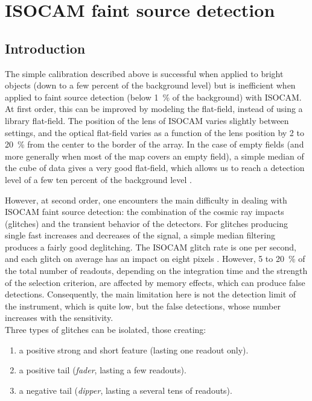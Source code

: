 \chapter{ISOCAM faint source detection}
\section{Introduction}

The simple calibration described above is successful when applied 
to bright objects (down to a 
few percent of the background level) but is inefficient when applied 
to faint source detection (below 1~\% of the background) with ISOCAM. 
At first order, this can be improved by modeling the flat-field, 
instead of using a library flat-field. The position of the 
lens of ISOCAM varies slightly between settings, 
and the optical flat-field 
varies as a function of the lens position by 2 to 20~\% from the 
center to the border of the array.  In the case of empty fields (and 
more generally when most of the map covers an empty field), a simple 
median of the cube of data gives a very good flat-field, which allows 
us to reach a detection level of a few ten percent of the background 
level \cite{starck:sta99_1}. 

However, at second order, one encounters the main difficulty in
dealing with ISOCAM faint source detection: the combination of the
cosmic ray impacts (glitches) and the transient behavior of the
detectors. For glitches producing single fast increases and
decreases of the signal,  a simple median filtering produces a fairly 
good deglitching. The ISOCAM glitch rate is one per second, 
and each glitch on average  has an impact on   
eight pixels \cite{starck:claret99}. However, 5 to 20~\% of the
total number of readouts, depending on the integration time and
the strength of the selection criterion, are affected by memory effects,
which can produce false detections. Consequently, the main limitation
here is not the detection limit of the instrument, which is quite low, 
but the false detections, whose number increases with the sensitivity. \\
Three types of glitches can be isolated, those creating:
\begin{enumerate}
\item a positive strong and short feature (lasting one readout only).  
\item a positive tail ({\em fader}, lasting a few readouts).
\item a negative tail ({\em dipper}, lasting a several tens of readouts).  
\end{enumerate}

